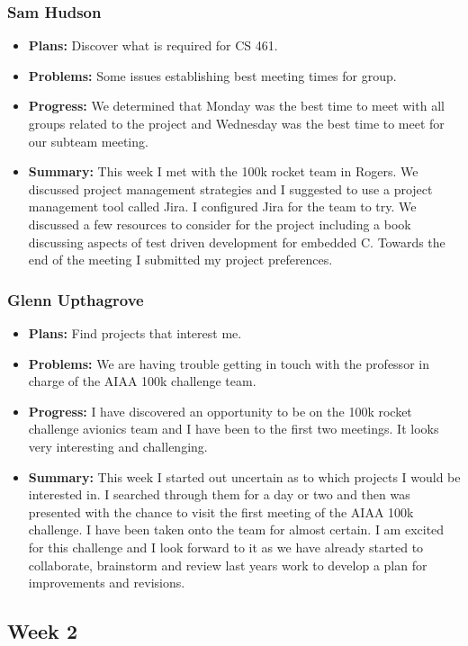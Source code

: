 \documentclass[onecolumn, draftclsnofoot,10pt, compsoc]{IEEEtran}
\begin{document}
\subsubsection{Sam Hudson}
\begin {itemize}
\item \textbf{Plans: }Discover what is required for CS 461.
\item \textbf{Problems: }Some issues establishing best meeting times for group.
\item \textbf{Progress: }We determined that Monday was the best time to meet with all groups related to the project and Wednesday was the best time to meet for our subteam meeting.
\item \textbf{Summary: }This week I met with the 100k rocket team in Rogers. We discussed project management strategies and I suggested to use a project management tool called Jira. I configured Jira for the team to try. We discussed a few resources to consider for the project including a book discussing aspects of test driven development for embedded C. Towards the end of the meeting I submitted my project preferences. 
\end {itemize}
\subsubsection{Glenn Upthagrove}
\begin {itemize}
 \item \textbf{Plans: }Find projects that interest me. 
 \item \textbf{Problems: }We are having trouble getting in touch with the professor in charge of the AIAA 100k challenge team. 
 \item \textbf{Progress: }I have discovered an opportunity to be on the 100k rocket challenge avionics team and I have been to the first two meetings. It looks very interesting and challenging.  
 \item \textbf{Summary: }This week I started out uncertain as to which projects I would be interested in. I searched through them for a day or two and then was presented with the chance to visit the first meeting of the AIAA 100k challenge. I have been taken onto the team for almost certain. I am excited for this challenge and I look forward to it as we have already started to collaborate, brainstorm and review last years work to develop a plan for improvements and revisions.  
\end {itemize}
\subsection {Week 2}
\end{document}
